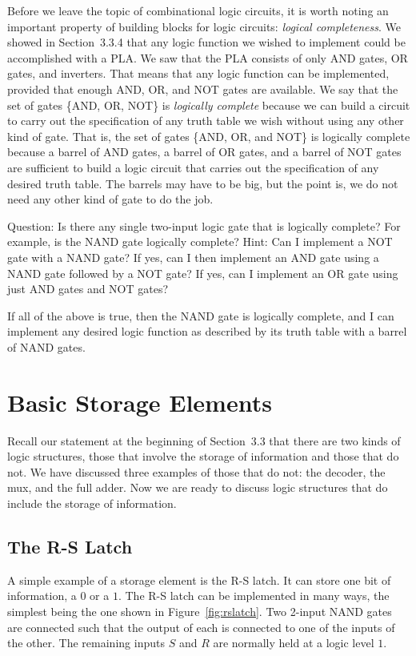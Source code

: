 \documentclass{patt}
\begin{document}
Before we leave the topic of combinational logic circuits, it is worth
noting an important property of building blocks for logic circuits:
{\em logical completeness}.  We showed in Section~3.3.4 that any logic
function we wished to implement could be accomplished with a PLA.  We
saw that the PLA consists of only AND gates, OR gates, and inverters.
That means that any logic function can be
implemented, provided that enough AND, OR, and NOT gates are
available.  We say that the set of gates \{AND, OR, NOT\} is {\em
logically complete}  because we can
build a circuit to carry out the specification of any truth table we
wish without using any other kind of gate.  That is, the set of gates
\{AND, OR, and NOT\} is logically complete because a barrel of AND
gates, a barrel of OR gates, and a barrel of NOT gates are sufficient
to build a logic circuit that carries out the specification of any
desired truth table.  The barrels may have to be big, but the
point is, we do not need any other kind of gate to do the job.

Question: Is there any single two-input logic gate that is logically
complete?  For example, is the NAND gate logically complete?  Hint: Can I
implement a NOT gate with a NAND gate?  If yes, can I then implement an AND
gate using a NAND gate followed by a NOT gate?  If yes, can I implement an
OR gate using just AND gates and NOT gates?  

If all of the above is true, then the NAND gate is logically complete, and
I can implement any desired logic function as described by its truth table
with a barrel of NAND gates.  

\section{Basic Storage Elements}

Recall our statement at the beginning of Section~3.3 that there are
two kinds of logic structures, those that involve the storage of
information and those that do not.  We have discussed three examples
of those that do not: the decoder, the mux, and the full adder.  Now
we are ready to discuss logic structures that do include the storage
of information.

\subsection{The R-S Latch}

A simple example of a storage element is the R-S latch.  It can store one bit 
of information, a $0$ or a $1$.  The R-S latch can be implemented in many
ways, the simplest being the one shown in Figure~\ref{fig:rslatch}.  Two 
2-input NAND gates are connected such that the output of each is connected 
to one of the inputs of the other.  The remaining inputs $S$ and $R$ are
normally held at a logic level $1$.
\end{document}
